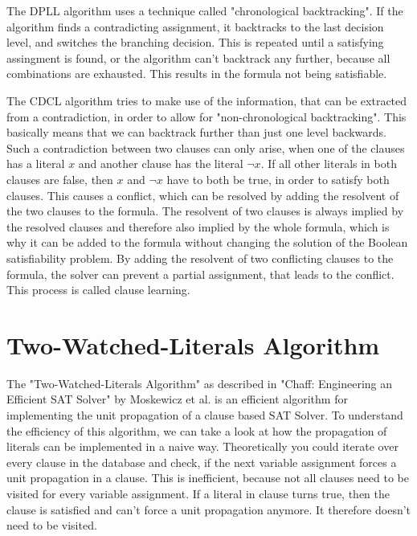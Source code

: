 The DPLL algorithm uses a technique called "chronological backtracking". If the algorithm finds a contradicting assignment, it backtracks to the last decision level, and switches the branching decision. This is repeated until a satisfying assingment is found, or the algorithm can't backtrack any further, because all combinations are exhausted. This results in the formula not being satisfiable. \cite{biere2009handbook}

The CDCL algorithm tries to make use of the information, that can be extracted from a contradiction, in order to allow for "non-chronological backtracking". This basically means that we can backtrack further than just one level backwards. \cite{biere2009handbook}
Such a contradiction between two clauses can only arise, when one of the clauses has a literal $x$ and another clause has the literal $\neg x$. If all other literals in both clauses are false, then $x$ and $\neg x$ have to both be true, in order to satisfy both clauses. This causes a conflict, which can be resolved by adding the resolvent of the two clauses to the formula. The resolvent of two clauses is always implied by the resolved clauses and therefore also implied by the whole formula, which is why it can be added to the formula without changing the solution of the Boolean satisfiability problem. By adding the resolvent of two conflicting clauses to the formula, the solver can prevent a partial assignment, that leads to the conflict. This process is called clause learning. \cite{biere2009handbook}

\section{Two-Watched-Literals Algorithm}
\label{sec:twoWatchedLiterals}

The "Two-Watched-Literals Algorithm" as described in "Chaff: Engineering an Efficient SAT Solver" \cite{moskewicz2001chaff} by Moskewicz et al. is an efficient algorithm for implementing the unit propagation of a clause based SAT Solver. To understand the efficiency of this algorithm, we can take a look at how the propagation of literals can be implemented in a naive way. Theoretically you could iterate over every clause in the database and check, if the next variable assignment forces a unit propagation in a clause. This is inefficient, because not all clauses need to be visited for every variable assignment. If a literal in clause turns true, then the clause is satisfied and can't force a unit propagation anymore. It therefore doesn't need to be visited.

